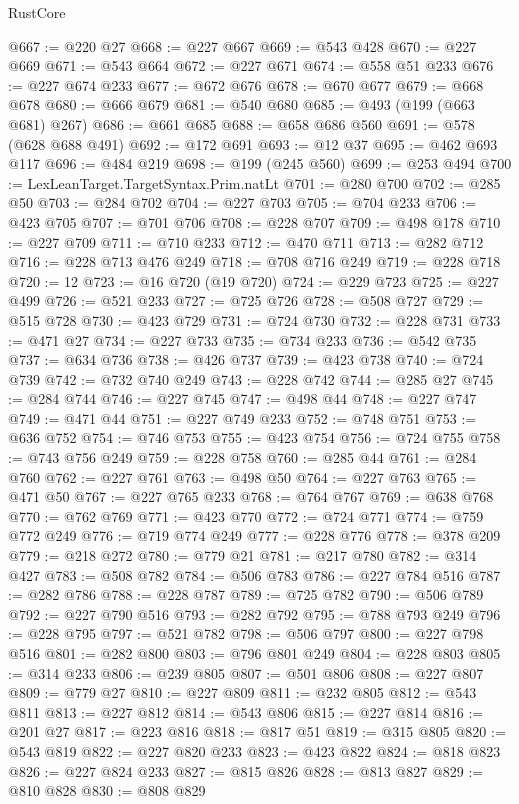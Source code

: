 \begin{lexlean}{RustCore}
\begin{coremodule}
@667 := @220 @27
@668 := @227 @667
@669 := @543 @428
@670 := @227 @669
@671 := @543 @664
@672 := @227 @671
@674 := @558 @51 @233
@676 := @227 @674 @233
@677 := @672 @676
@678 := @670 @677
@679 := @668 @678
@680 := @666 @679
@681 := @540 @680
@685 := @493 (@199 (@663 @681) @267)
@686 := @661 @685
@688 := @658 @686 @560
@691 := @578 (@628 @688 @491)
@692 := @172 @691
@693 := @12 @37
@695 := @462 @693 @117
@696 := @484 @219
@698 := @199 (@245 @560)
@699 := @253 @494
@700 := LexLeanTarget.TargetSyntax.Prim.natLt
@701 := @280 @700
@702 := @285 @50
@703 := @284 @702
@704 := @227 @703
@705 := @704 @233
@706 := @423 @705
@707 := @701 @706
@708 := @228 @707
@709 := @498 @178
@710 := @227 @709
@711 := @710 @233
@712 := @470 @711
@713 := @282 @712
@716 := @228 @713 @476 @249
@718 := @708 @716 @249
@719 := @228 @718
@720 := 12
@723 := @16 @720 (@19 @720)
@724 := @229 @723
@725 := @227 @499
@726 := @521 @233
@727 := @725 @726
@728 := @508 @727
@729 := @515 @728
@730 := @423 @729
@731 := @724 @730
@732 := @228 @731
@733 := @471 @27
@734 := @227 @733
@735 := @734 @233
@736 := @542 @735
@737 := @634 @736
@738 := @426 @737
@739 := @423 @738
@740 := @724 @739
@742 := @732 @740 @249
@743 := @228 @742
@744 := @285 @27
@745 := @284 @744
@746 := @227 @745
@747 := @498 @44
@748 := @227 @747
@749 := @471 @44
@751 := @227 @749 @233
@752 := @748 @751
@753 := @636 @752
@754 := @746 @753
@755 := @423 @754
@756 := @724 @755
@758 := @743 @756 @249
@759 := @228 @758
@760 := @285 @44
@761 := @284 @760
@762 := @227 @761
@763 := @498 @50
@764 := @227 @763
@765 := @471 @50
@767 := @227 @765 @233
@768 := @764 @767
@769 := @638 @768
@770 := @762 @769
@771 := @423 @770
@772 := @724 @771
@774 := @759 @772 @249
@776 := @719 @774 @249
@777 := @228 @776
@778 := @378 @209
@779 := @218 @272
@780 := @779 @21
@781 := @217 @780
@782 := @314 @427
@783 := @508 @782
@784 := @506 @783
@786 := @227 @784 @516
@787 := @282 @786
@788 := @228 @787
@789 := @725 @782
@790 := @506 @789
@792 := @227 @790 @516
@793 := @282 @792
@795 := @788 @793 @249
@796 := @228 @795
@797 := @521 @782
@798 := @506 @797
@800 := @227 @798 @516
@801 := @282 @800
@803 := @796 @801 @249
@804 := @228 @803
@805 := @314 @233
@806 := @239 @805
@807 := @501 @806
@808 := @227 @807
@809 := @779 @27
@810 := @227 @809
@811 := @232 @805
@812 := @543 @811
@813 := @227 @812
@814 := @543 @806
@815 := @227 @814
@816 := @201 @27
@817 := @223 @816
@818 := @817 @51
@819 := @315 @805
@820 := @543 @819
@822 := @227 @820 @233
@823 := @423 @822
@824 := @818 @823
@826 := @227 @824 @233
@827 := @815 @826
@828 := @813 @827
@829 := @810 @828
@830 := @808 @829

\end{coremodule}
\end{lexlean}
